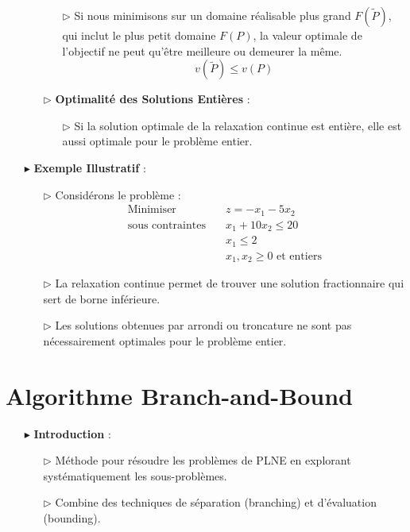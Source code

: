 \documentclass{report}
\begin{document}
\begin{multicols*}{2}
\begin{itemize}
\begin{enumerate}
\begin{itemize}
\begin{tikzpicture}
\end{tikzpicture}
        \item [$\rhd$ ] 
            Si nous minimisons sur un domaine réalisable plus grand 
            $F(\tilde{P})$, qui inclut le plus petit domaine $F(P)$, 
            la valeur optimale de l’objectif ne peut qu’être meilleure 
            ou demeurer la même.
            \[ v(\tilde{P}) \leq v(P) \]
        \end{itemize}
        \item[$\rhd$] \textbf{Optimalité des Solutions Entières} :
        \begin{itemize}
            \item[$\rhd$] Si la solution optimale de la relaxation continue est entière, elle est aussi optimale pour le problème entier.
        \end{itemize}
    \end{enumerate}

    \item[$\blacktriangleright$] \textbf{Exemple Illustratif} :
    \begin{itemize}
        \item[$\rhd$] Considérons le problème :
        \[
        \begin{aligned}
        \text{Minimiser} & \quad z = -x_1 - 5x_2 \\
        \text{sous contraintes} & \quad x_1 + 10x_2 \leq 20 \\
        & \quad x_1 \leq 2 \\
        & \quad x_1, x_2 \geq 0 \text{ et entiers}
        \end{aligned}
        \]
        \item[$\rhd$] La relaxation continue permet de trouver une solution fractionnaire qui sert de borne inférieure.
        \item[$\rhd$] Les solutions obtenues par arrondi ou troncature ne sont pas nécessairement optimales pour le problème entier.
    \end{itemize}
\end{itemize}

\section{Algorithme Branch-and-Bound}

\begin{itemize}
    \item[$\blacktriangleright$] \textbf{Introduction} :
    \begin{itemize}
        \item[$\rhd$] Méthode pour résoudre les problèmes de PLNE en explorant systématiquement les sous-problèmes.
        \item[$\rhd$] Combine des techniques de séparation (branching) et d'évaluation (bounding).
    \end{itemize}


\end{itemize}
\end{multicols*}
\end{document}
